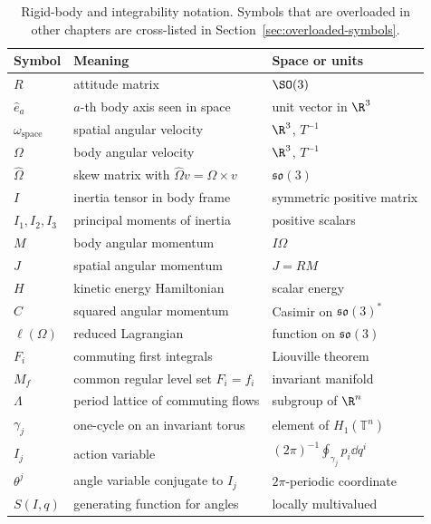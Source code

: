 \begin{table}[htbp]
\centering
\caption{Rigid-body and integrability notation. Symbols that are overloaded in
other chapters are cross-listed in Section~\ref{sec:overloaded-symbols}.}
\label{tab:rigid-integrability-notation}
\small
\begin{tabular}{p{}p{}p{}}
\toprule
Symbol & Meaning & Space or units\\
\midrule
\(R\) & attitude matrix & \(\SO(3)\)\\
\(\hat e_a\) & \(a\)-th body axis seen in space & unit vector in \(\R^3\)\\
\(\omega_{\mathrm{space}}\) & spatial angular velocity & \(\R^3\), \(T^{-1}\)\\
\(\Omega\) & body angular velocity & \(\R^3\), \(T^{-1}\)\\
\(\widehat\Omega\) & skew matrix with \(\widehat\Omega v=\Omega\times v\) &
\(\mathfrak{so}(3)\)\\
\(I\) & inertia tensor in body frame & symmetric positive matrix\\
\(I_1,I_2,I_3\) & principal moments of inertia & positive scalars\\
\(M\) & body angular momentum & \(I\Omega\)\\
\(J\) & spatial angular momentum & \(J=RM\)\\
\(H\) & kinetic energy Hamiltonian & scalar energy\\
\(C\) & squared angular momentum & Casimir on \(\mathfrak{so}(3)^*\)\\
\(\ell(\Omega)\) & reduced Lagrangian & function on \(\mathfrak{so}(3)\)\\
\(F_i\) & commuting first integrals & Liouville theorem\\
\(M_f\) & common regular level set \(F_i=f_i\) & invariant manifold\\
\(\Lambda\) & period lattice of commuting flows & subgroup of \(\R^n\)\\
\(\gamma_j\) & one-cycle on an invariant torus & element of \(H_1(\mathbb T^n)\)\\
\(I_j\) & action variable & \((2\pi)^{-1}\oint_{\gamma_j}p_i\dd q^i\)\\
\(\theta^j\) & angle variable conjugate to \(I_j\) & \(2\pi\)-periodic coordinate\\
\(S(I,q)\) & generating function for angles & locally multivalued\\
\bottomrule
\end{tabular}
\end{table}

